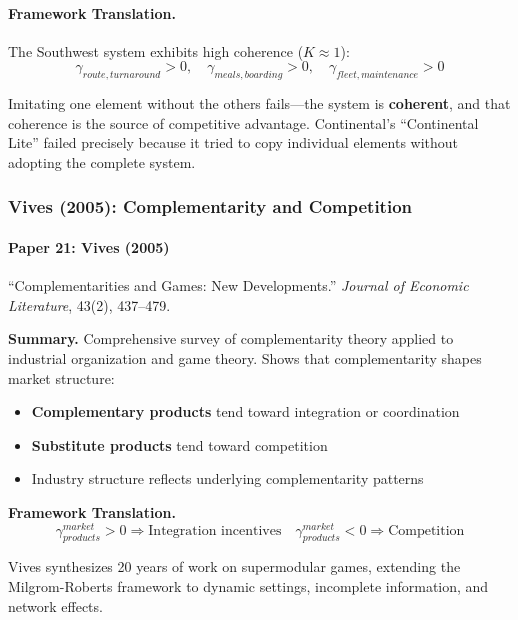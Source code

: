 \paragraph{Framework Translation.}
The Southwest system exhibits high coherence ($K \approx 1$):
\begin{equation}
\gamma_{route,turnaround} > 0, \quad \gamma_{meals,boarding} > 0, \quad
\gamma_{fleet,maintenance} > 0
\end{equation}

Imitating one element without the others fails---the system is \textbf{coherent},
and that coherence is the source of competitive advantage. Continental's
``Continental Lite'' failed precisely because it tried to copy individual
elements without adopting the complete system.

\subsubsection{Vives (2005): Complementarity and Competition}

\paragraph{Paper 21: Vives (2005)}

``Complementarities and Games: New Developments.''
\textit{Journal of Economic Literature}, 43(2), 437--479.

\textbf{Summary.}
Comprehensive survey of complementarity theory applied to industrial organization
and game theory. Shows that complementarity shapes market structure:

\begin{itemize}
    \item \textbf{Complementary products} tend toward integration or coordination
    \item \textbf{Substitute products} tend toward competition
    \item Industry structure reflects underlying complementarity patterns
\end{itemize}

\textbf{Framework Translation.}
\begin{equation}
\gamma_{products}^{market} > 0 \Rightarrow \text{Integration incentives} \quad
\gamma_{products}^{market} < 0 \Rightarrow \text{Competition}
\end{equation}

Vives synthesizes 20 years of work on supermodular games, extending
the Milgrom-Roberts framework to dynamic settings, incomplete information,
and network effects.

